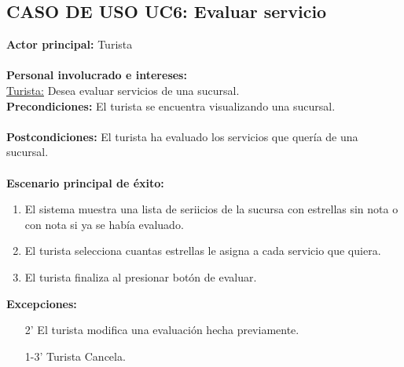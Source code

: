\documentclass[12pt]{article}
\begin{document}
\subsection{\textbf{CASO DE USO UC6:} Evaluar servicio }
\textbf{Actor principal:} Turista\\
\\
\textbf{Personal involucrado e intereses: }\\\underline{Turista:} Desea evaluar servicios de una sucursal.
\\
\textbf{Precondiciones:} El turista se encuentra visualizando una sucursal.\\
\\
\textbf{Postcondiciones:} El turista ha evaluado los servicios que quería de una sucursal.\\
\\
\textbf{Escenario principal de éxito:}
\begin{enumerate}
\item El sistema muestra una lista de seriicios de la sucursa con estrellas sin nota o con nota si ya se había evaluado.
\item El turista selecciona cuantas estrellas le asigna a cada servicio que quiera.
\item El turista finaliza al presionar botón de evaluar.
\end{enumerate}
\textbf{Excepciones:}
\begin{enumerate}
\item[2'] El turista modifica una evaluación hecha previamente.
\item[1-3'] Turista Cancela.
\end{enumerate}
\end{document}
